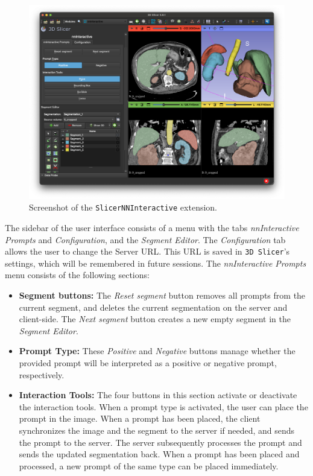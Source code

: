 \documentclass[
]{article}
\begin{document}
\begin{figure}
\centering
\includegraphics{img/screenshot.png}
\caption{Screenshot of the \texttt{SlicerNNInteractive}
extension.\label{fig:screenshot}}
\end{figure}

The sidebar of the user interface consists of a menu with the tabs
\emph{nnInteractive Prompts} and \emph{Configuration}, and the
\emph{Segment Editor}. The \emph{Configuration} tab allows the user to
change the Server URL. This URL is saved in \texttt{3D\ Slicer}'s
settings, which will be remembered in future sessions. The
\emph{nnInteractive Prompts} menu consists of the following sections:

\begin{itemize}
\item
  \textbf{Segment buttons:} The \emph{Reset segment} button removes all
  prompts from the current segment, and deletes the current segmentation
  on the server and client-side. The \emph{Next segment} button creates
  a new empty segment in the \emph{Segment Editor}.
\item
  \textbf{Prompt Type:} These \emph{Positive} and \emph{Negative}
  buttons manage whether the provided prompt will be interpreted as a
  positive or negative prompt, respectively.
\item
  \textbf{Interaction Tools:} The four buttons in this section activate
  or deactivate the interaction tools. When a prompt type is activated,
  the user can place the prompt in the image. When a prompt has been
  placed, the client synchronizes the image and the segment to the
  server if needed, and sends the prompt to the server. The server
  subsequently processes the prompt and sends the updated segmentation
  back. When a prompt has been placed and processed, a new prompt of the
  same type can be placed immediately.
\end{itemize}
\end{document}
